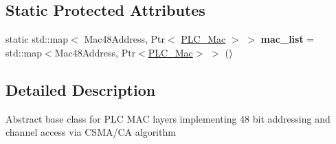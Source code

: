 \subsection*{\-Static \-Protected \-Attributes}
\begin{DoxyCompactItemize}
\item 
\hypertarget{classns3_1_1PLC__Mac_a0b2067fcb3213637969b858e74684bcd}{static std\-::map$<$ \-Mac48\-Address, \*
\-Ptr$<$ \hyperlink{classns3_1_1PLC__Mac}{\-P\-L\-C\-\_\-\-Mac} $>$ $>$ {\bfseries mac\-\_\-list} = std\-::map$<$\-Mac48\-Address, \-Ptr$<$\hyperlink{classns3_1_1PLC__Mac}{\-P\-L\-C\-\_\-\-Mac}$>$ $>$ ()}\label{classns3_1_1PLC__Mac_a0b2067fcb3213637969b858e74684bcd}

\end{DoxyCompactItemize}


\subsection{\-Detailed \-Description}
\-Abstract base class for \-P\-L\-C \-M\-A\-C layers implementing 48 bit addressing and channel access via \-C\-S\-M\-A/\-C\-A algorithm 

